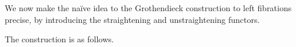 \label{secd}

We now make the na\"ive idea to the Grothendieck construction to left fibrations precise, by introducing the straightening 
and unstraightening functors.

The construction is as follows. \tbc